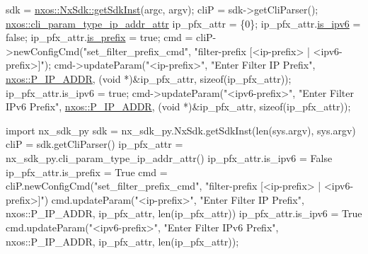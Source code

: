 \begin{DoxyCode}
sdk = \mbox{\hyperlink{classnxos_1_1_nx_sdk_a5050e2d26c40744b4fc7862068a83f39}{nxos::NxSdk::getSdkInst}}(argc, argv);
cliP = sdk->getCliParser();
\mbox{\hyperlink{structnxos_1_1cli__param__type__ip__addr__attr__}{nxos::cli\_param\_type\_ip\_addr\_attr}} ip\_pfx\_attr = \{0\};
ip\_pfx\_attr.\mbox{\hyperlink{structnxos_1_1cli__param__type__ip__addr__attr___a767316999a46b9f012b818131455980b}{is\_ipv6}} = \textcolor{keyword}{false};
ip\_pfx\_attr.\mbox{\hyperlink{structnxos_1_1cli__param__type__ip__addr__attr___a0a059b592a9bc394c9fed521fb5a9552}{is\_prefix}} = \textcolor{keyword}{true};
cmd = cliP->newConfigCmd(\textcolor{stringliteral}{"set\_filter\_prefix\_cmd"},
                         \textcolor{stringliteral}{"filter-prefix [<ip-prefix> | <ipv6-prefix>]"});
cmd->updateParam(\textcolor{stringliteral}{"<ip-prefix>"}, \textcolor{stringliteral}{"Enter Filter IP Prefix"}, \mbox{\hyperlink{namespacenxos_ad220d5ba6a2a5d7edeab55cb89d309eaa082fd4c4bdfc40e03adc023b3d4e5edc}{nxos::P\_IP\_ADDR}},
                 (\textcolor{keywordtype}{void} *)&ip\_pfx\_attr, \textcolor{keyword}{sizeof}(ip\_pfx\_attr));
ip\_pfx\_attr.is\_ipv6 = \textcolor{keyword}{true};
cmd->updateParam(\textcolor{stringliteral}{"<ipv6-prefix>"}, \textcolor{stringliteral}{"Enter Filter IPv6 Prefix"}, \mbox{\hyperlink{namespacenxos_ad220d5ba6a2a5d7edeab55cb89d309eaa082fd4c4bdfc40e03adc023b3d4e5edc}{nxos::P\_IP\_ADDR}},
                 (\textcolor{keywordtype}{void} *)&ip\_pfx\_attr, \textcolor{keyword}{sizeof}(ip\_pfx\_attr));
\end{DoxyCode}



\begin{DoxyCode}
\textcolor{keyword}{import} nx\_sdk\_py
sdk = nx\_sdk\_py.NxSdk.getSdkInst(len(sys.argv), sys.argv)
cliP = sdk.getCliParser()
ip\_pfx\_attr = nx\_sdk\_py.cli\_param\_type\_ip\_addr\_attr()
ip\_pfx\_attr.is\_ipv6 = \textcolor{keyword}{False}
ip\_pfx\_attr.is\_prefix = \textcolor{keyword}{True}
cmd = cliP.newConfigCmd(\textcolor{stringliteral}{"set\_filter\_prefix\_cmd"},
                        \textcolor{stringliteral}{"filter-prefix [<ip-prefix> | <ipv6-prefix>]"})
cmd.updateParam(\textcolor{stringliteral}{"<ip-prefix>"}, \textcolor{stringliteral}{"Enter Filter IP Prefix"}, nxos::P\_IP\_ADDR,
                ip\_pfx\_attr, len(ip\_pfx\_attr))
ip\_pfx\_attr.is\_ipv6 = \textcolor{keyword}{True}
cmd.updateParam(\textcolor{stringliteral}{"<ipv6-prefix>"}, \textcolor{stringliteral}{"Enter Filter IPv6 Prefix"}, nxos::P\_IP\_ADDR,
                ip\_pfx\_attr, len(ip\_pfx\_attr));
\end{DoxyCode}
 

